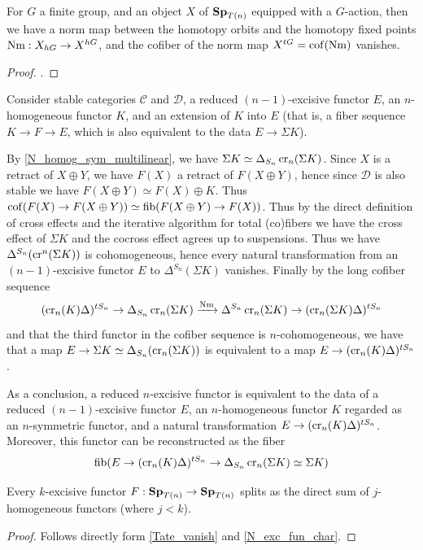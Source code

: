 	\begin{thm}\label{Tate_vanish}
		For $G$ a finite group, and an object $X$ of $\mathbf{Sp}_{T(n)}$ equipped with a $G$-action, then we have a norm map between the homotopy orbits and the homotopy fixed points $\operatorname{\mathrm{Nm}}:X_{hG}\to X^{hG}$, and the cofiber of the norm map $X^{tG}=\operatorname{\mathrm{cof}}(\operatorname{\mathrm{Nm}})$ vanishes. 
	\end{thm}
	\begin{proof}
		. 
	\end{proof}

	\begin{const}\label{N_exc_fun_char}
		Consider stable categories $\mathcal{C}$ and $\mathcal{D}$, a reduced $(n-1)$-excisive functor $E$, an $n$-homogeneous functor $K$, and an extension of $K$ into $E$ (that is, a fiber sequence $K\to F\to E$, which is also equivalent to the data $E\to\Sigma K$). 

		By \cref{N_homog_sym_multilinear}, we have $\Sigma K\simeq\Delta_{S_n}\operatorname{\mathrm{cr}}_n(\Sigma K)$. Since $X$ is a retract of $X\oplus Y$, we have $F(X)$ a retract of $F(X\oplus Y)$, hence since $\mathcal{D}$ is also stable we have $F(X\oplus Y)\simeq F(X)\oplus K$. Thus $\operatorname{\mathrm{cof}}(F(X)\to F(X\oplus Y))\simeq\operatorname{\mathrm{fib}}(F(X\oplus Y)\to F(X))$. Thus by the direct definition of cross effects and the iterative algorithm for total (co)fibers we have the cross effect of $\Sigma K$ and the cocross effect agrees up to suspensions. Thus we have $\Delta^{S_n}(\operatorname{\mathrm{cr}}^n(\Sigma K))$ is cohomogeneous, hence every natural transformation from an $(n-1)$-excisive functor $E$ to $\Delta^{S_n}(\Sigma K)$ vanishes. Finally by the long cofiber sequence 
		\[ (\operatorname{\mathrm{cr}}_n(K)\Delta)^{tS_n}\to\Delta_{S_n}\operatorname{\mathrm{cr}}_n(\Sigma K)\xrightarrow{\operatorname{\mathrm{Nm}}}\Delta^{S_n}\operatorname{\mathrm{cr}}_n(\Sigma K)\to(\operatorname{\mathrm{cr}}_n(\Sigma K)\Delta)^{tS_n} \]
		and that the third functor in the cofiber sequence is $n$-cohomogeneous, we have that a map $E\to\Sigma K\simeq\Delta_{S_n}(\operatorname{\mathrm{cr}}_n(\Sigma K))$ is equivalent to a map $E\to(\operatorname{\mathrm{cr}}_n(K)\Delta)^{tS_n}$. 

		As a conclusion, a reduced $n$-excisive functor is equivalent to the data of a reduced $(n-1)$-excisive functor $E$, an $n$-homogeneous functor $K$ regarded as an $n$-symmetric functor, and a natural transformation $E\to(\operatorname{\mathrm{cr}}_n(K)\Delta)^{tS_n}$. Moreover, this functor can be reconstructed as the fiber 
		\[ \operatorname{\mathrm{fib}}(E\to(\operatorname{\mathrm{cr}}_n(K)\Delta)^{tS_n}\to\Delta_{S_n}\operatorname{\mathrm{cr}}_n(\Sigma K)\simeq\Sigma K) \]
	\end{const}

	\begin{coro}\label{Tel_loc_k_exc_split}
		Every $k$-excisive functor $F:\mathbf{Sp}_{T(n)}\to\mathbf{Sp}_{T(n)}$ splits as the direct sum of $j$-homogeneous functors (where $j<k$). 
	\end{coro}
	\begin{proof}
		Follows directly form \cref{Tate_vanish} and \cref{N_exc_fun_char}. 
	\end{proof}

